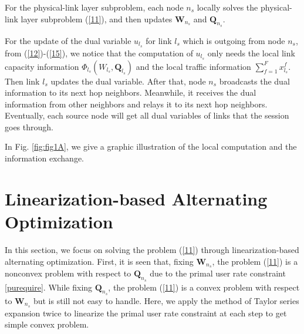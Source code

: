 \documentclass[12pt,onecolumn,tworows]{IEEEtran}
\begin{document}
For the physical-link layer subproblem, each node ${n_s}$ locally solves the physical-link layer subproblem (\ref{11}), and then updates ${\mathbf{W}_{{n_s}}}$ and ${{\mathbf{Q}}_{{n_s}}}$.

For the update of the dual variable ${u_{{l_s}}}$ for link ${l_s}$ which is outgoing from node ${n_s}$, from (\ref{12})-(\ref{15}), we notice that the computation of ${u_{{l_s}}}$ only needs the local link capacity information ${\Phi _{{l_s}}}({W_{{l_s}}},{{\mathbf{Q}}_{{l_s}}})$ and the local traffic information $\sum_{f=1}^Fx_{l_s}^f$. Then link ${l_s}$ updates the dual variable. After that, node ${n_s}$ broadcasts the dual information to its next hop neighbors. Meanwhile, it receives the dual information from other neighbors and relays it to its next hop neighbors. Eventually, each source node will get all dual variables of links that the session goes through.

In Fig. \ref{fig:fig1A}, we give a graphic illustration of the local computation and the information exchange.

\section{Linearization-based Alternating Optimization}
In this section, we focus on solving the problem (\ref{11}) through linearization-based alternating optimization. First, it is seen that, fixing $\mathbf{W}_{n_s}$, the problem (\ref{11}) is a nonconvex problem with  respect to $\mathbf{Q}_{n_s}$ due to the primal user rate constraint \eqref{purequire}. While fixing $\mathbf{Q}_{n_s}$, the problem (\ref{11}) is a convex problem with respect to $\mathbf{W}_{n_s}$ but is still not easy to handle. Here, we apply the method of Taylor series
expansion twice to linearize the primal user rate constraint at
each step to get simple convex problem.
\end{document}
